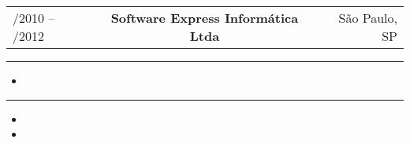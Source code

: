 \documentclass[a4paper]{article}
\makeatletter
\newcommand{\CustomSection}[1]{
\vspace{2.0\baselineskip}
\noindent \large{\MakeUppercase{#1}}
\vspace{0.5\baselineskip}
\hrule
\vspace{0.8\baselineskip}
}
\newcommand{\Company}[5]{
\noindent
\begin{tabular*}{\columnwidth}{@{\extracolsep{\fill}}lcr}
#2 & \textbf{#1} & #3 \\
\end{tabular*}
\noindent{\textit{#4}}

\vspace{1.0\baselineskip}

\begin{adjustwidth}{35pt}{35pt}
  #5
\end{adjustwidth}

\vspace{2.0\baselineskip}
}
\makeatother
\begin{document}
\Company{Software Express Informática Ltda}{\may/2010 – \february/2012}{São Paulo, SP}{\swIntern}{

\begin{itemize}
\setopics
\end{itemize}

}

\CustomSection{\relatedActivities}
\begin{itemize}
    \item \proatopic
\end{itemize}

\CustomSection{\languages}
\begin{itemize}
    \item \englishLang
    \item \portugueseLang
\end{itemize}
\end{document}
